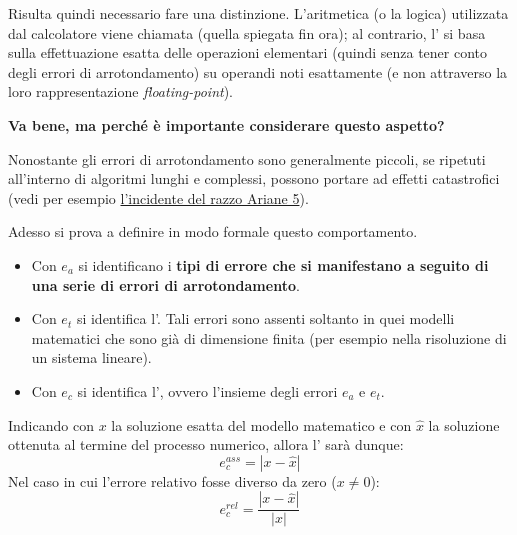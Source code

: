 \highspace
Risulta quindi necessario fare una distinzione. L'aritmetica (o la logica) utilizzata dal calcolatore viene chiamata  (quella spiegata fin ora); al contrario, l' si basa sulla effettuazione esatta delle operazioni elementari (quindi senza tener conto degli errori di arrotondamento) su operandi noti esattamente (e non attraverso la loro rappresentazione \emph{floating-point}).

\begin{flushleft}
    \textcolor{Green3}{ \textbf{Va bene, ma perché è importante considerare questo aspetto?}}
\end{flushleft}
Nonostante gli errori di arrotondamento sono generalmente piccoli, se ripetuti all'interno di algoritmi lunghi e complessi, possono portare ad effetti catastrofici (vedi per esempio \href{https://www.bbc.com/future/article/20150505-the-numbers-that-lead-to-disaster}{l'incidente del razzo Ariane 5}).

\highspace
Adesso si prova a definire in modo formale questo comportamento. 
\begin{itemize}
    \item Con $e_{a}$ si identificano i \textbf{tipi di errore che si manifestano a seguito di una serie di errori di arrotondamento}.
    
    \item Con $e_{t}$ si identifica l'. Tali errori sono assenti soltanto in quei modelli matematici che sono già di dimensione finita (per esempio nella risoluzione di un sistema lineare).
    
    \item Con $e_{c}$ si identifica l', ovvero l'insieme degli errori $e_{a}$ e $e_{t}$.
\end{itemize}
Indicando con $x$ la soluzione esatta del modello matematico e con $\widehat{x}$ la soluzione ottenuta al termine del processo numerico, allora l' sarà dunque:
\begin{equation}
    e_{c}^{ass} = \left| x - \widehat{x} \right|
\end{equation}
Nel caso in cui l'errore relativo fosse diverso da zero ($x \ne 0$):
\begin{equation}
    e_{c}^{rel} = \dfrac{
        \left| x - \widehat{x} \right|
    }{
        \left| x \right|
    }
\end{equation}

